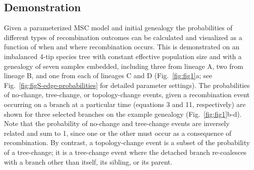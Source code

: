 \documentclass[11pt]{article}
\begin{document}
\subsection{Demonstration}
Given a parameterized MSC model and initial genealogy the probabilities of 
different types of recombination outcomes can be calculated and visualized as 
a function of when and where recombination occurs. This is demonstrated on an 
imbalanced 4-tip species tree with constant effective population size 
and with a genealogy of seven samples embedded, 
including three from lineage A, two from lineage B, and one from each of lineages
C and D (Fig.~\ref{fig:fig1}a; see Fig.~\ref{fig:figS-edge-probabilities} for 
detailed parameter settings). 
The probabilities of no-change, tree-change, or topology-change events, 
given a recombination event occurring on a branch at a particular time 
(equations 3 and 11, respectively) are shown for three selected branches
on the example genealogy (Fig.~\ref{fig:fig1}b-d). 
Note that the probability of no-change and tree-change events 
are inversely related and sum to 1, since one or the other must occur as a consequence 
of recombination. By contrast, a topology-change event is a subset of the 
probability of a tree-change; 
it is a tree-change event where the detached branch re-coalesces with 
a branch other than itself, its sibling, or its parent.

\end{document}
